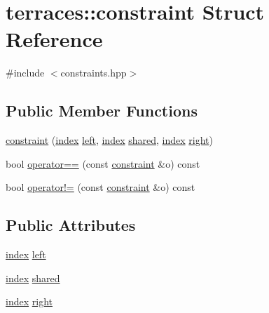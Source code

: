 \hypertarget{structterraces_1_1constraint}{}\section{terraces\+:\+:constraint Struct Reference}
\label{structterraces_1_1constraint}


{\ttfamily \#include $<$constraints.\+hpp$>$}

\subsection*{Public Member Functions}
\begin{DoxyCompactItemize}
\item 
\hyperlink{structterraces_1_1constraint_a6720264dc0ff93da5d69f3465239b070}{constraint} (\hyperlink{namespaceterraces_adbc33ccb543d1634e96d0eb02e472c77}{index} \hyperlink{structterraces_1_1constraint_a3cf21aa478cffed5ffca326814b6ced2}{left}, \hyperlink{namespaceterraces_adbc33ccb543d1634e96d0eb02e472c77}{index} \hyperlink{structterraces_1_1constraint_aa65e6eefccf91e555292f6ed34519eb8}{shared}, \hyperlink{namespaceterraces_adbc33ccb543d1634e96d0eb02e472c77}{index} \hyperlink{structterraces_1_1constraint_a649ff5f6c21e71ced0dd0c5c3cfa4be6}{right})
\item 
bool \hyperlink{structterraces_1_1constraint_ae9645e30399ab19bd08d2cdaf67b23e9}{operator==} (const \hyperlink{structterraces_1_1constraint}{constraint} \&o) const
\item 
bool \hyperlink{structterraces_1_1constraint_afa53046f3ebfbc0855747647baec02c9}{operator!=} (const \hyperlink{structterraces_1_1constraint}{constraint} \&o) const
\end{DoxyCompactItemize}
\subsection*{Public Attributes}
\begin{DoxyCompactItemize}
\item 
\hyperlink{namespaceterraces_adbc33ccb543d1634e96d0eb02e472c77}{index} \hyperlink{structterraces_1_1constraint_a3cf21aa478cffed5ffca326814b6ced2}{left}
\item 
\hyperlink{namespaceterraces_adbc33ccb543d1634e96d0eb02e472c77}{index} \hyperlink{structterraces_1_1constraint_aa65e6eefccf91e555292f6ed34519eb8}{shared}
\item 
\hyperlink{namespaceterraces_adbc33ccb543d1634e96d0eb02e472c77}{index} \hyperlink{structterraces_1_1constraint_a649ff5f6c21e71ced0dd0c5c3cfa4be6}{right}
\end{DoxyCompactItemize}



